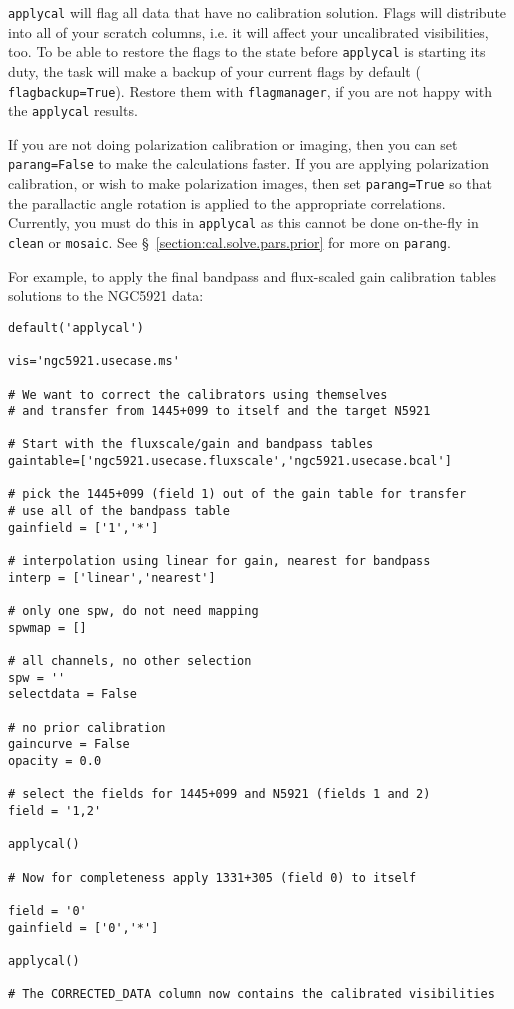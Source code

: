 {\tt applycal} will flag all data that have no calibration
solution. Flags will distribute into all of your scratch columns,
i.e. it will affect your uncalibrated visibilities, too. To be able to
restore the flags to the state before {\tt applycal} is starting its
duty, the task will make a backup of your current flags by default ({\tt
  flagbackup=True}). Restore them with {\tt flagmanager}, if you are
not happy with the {\tt applycal} results.



If you are not doing polarization calibration or imaging, then you can set 
{\tt parang=False} to make the calculations faster.  If you are
applying polarization calibration, or wish to make polarization
images, then set {\tt parang=True} so that the parallactic angle
rotation is applied to the appropriate correlations.  Currently,
you must do this in {\tt applycal} as this cannot be done on-the-fly
in {\tt clean} or {\tt mosaic}.  
See \S~\ref{section:cal.solve.pars.prior} for more on {\tt parang}.


For example, to apply the final bandpass and flux-scaled gain
calibration tables solutions to the NGC5921 data:
\small
\begin{verbatim}
default('applycal')

vis='ngc5921.usecase.ms'

# We want to correct the calibrators using themselves
# and transfer from 1445+099 to itself and the target N5921

# Start with the fluxscale/gain and bandpass tables
gaintable=['ngc5921.usecase.fluxscale','ngc5921.usecase.bcal']
         
# pick the 1445+099 (field 1) out of the gain table for transfer
# use all of the bandpass table
gainfield = ['1','*']

# interpolation using linear for gain, nearest for bandpass
interp = ['linear','nearest']

# only one spw, do not need mapping
spwmap = []

# all channels, no other selection
spw = ''
selectdata = False

# no prior calibration
gaincurve = False
opacity = 0.0

# select the fields for 1445+099 and N5921 (fields 1 and 2)
field = '1,2'

applycal()

# Now for completeness apply 1331+305 (field 0) to itself

field = '0'
gainfield = ['0','*']

applycal()

# The CORRECTED_DATA column now contains the calibrated visibilities
\end{verbatim}
\normalsize

